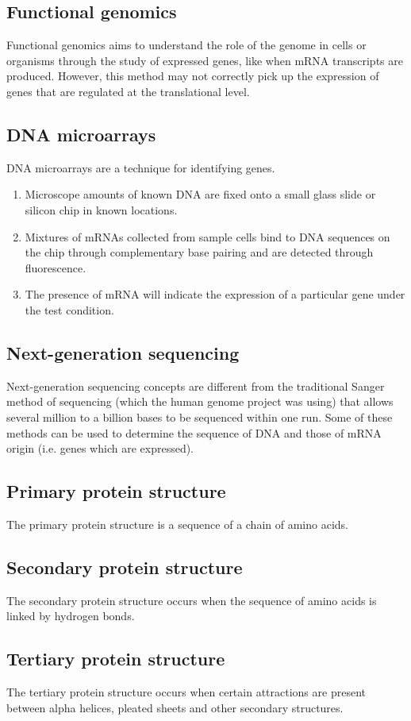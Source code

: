 \documentclass[11pt]{article}
\begin{document}
\subsection{Functional genomics}
\label{sec:org6edff13}
Functional genomics aims to understand the role of the genome in cells or organisms through the study of expressed genes, like when mRNA transcripts are produced. However, this method may not correctly pick up the expression of genes that are regulated at the translational level.
\subsection{DNA microarrays}
\label{sec:org38038d3}
DNA microarrays are a technique for identifying genes.
\begin{enumerate}
\item Microscope amounts of known DNA are fixed onto a small glass slide or silicon chip in known locations.
\item Mixtures of mRNAs collected from sample cells bind to DNA sequences on the chip through complementary base pairing and are detected through fluorescence.
\item The presence of mRNA will indicate the expression of a particular gene under the test condition.
\end{enumerate}
\subsection{Next-generation sequencing}
\label{sec:org762c2ba}
Next-generation sequencing concepts are different from the traditional Sanger method of sequencing (which the human genome project was using) that allows several million to a billion bases to be sequenced within one run. Some of these methods can be used to determine the sequence of DNA and those of mRNA origin (i.e. genes which are expressed).
\subsection{Primary protein structure}
\label{sec:org361f1b4}
The primary protein structure is a sequence of a chain of amino acids.
\subsection{Secondary protein structure}
\label{sec:org186468c}
The secondary protein structure occurs when the sequence of amino acids is linked by hydrogen bonds.
\subsection{Tertiary protein structure}
\label{sec:org6b83dc7}
The tertiary protein structure occurs when certain attractions are present between alpha helices, pleated sheets and other secondary structures.
\end{document}
